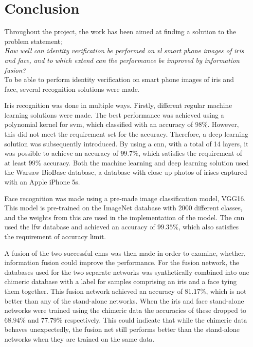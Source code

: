 \chapter{Conclusion}\label{ch:conclusion}\glsresetall
Throughout the project, the work has been aimed at finding a solution to the problem statement; \\

\textit{How well can identity verification be performed on \gls{vl} smart phone images of iris and face, and to which extend can the performance be improved by information fusion?}\\

To be able to perform identity verification on smart phone images of iris and face, several recognition solutions were made.

Iris recognition was done in multiple ways. Firstly, different regular machine learning solutions were made. The best performance was achieved using a polynomial kernel for \gls{svm}, which classified with an accuracy of $98\%$. However, this did not meet the requirement set for the accuracy. Therefore, a deep learning solution was subsequently introduced. By using a \gls{cnn}, with a total of 14 layers, it was possible to achieve an accuracy of $99.7\%$, which satisfies the requirement of at least $99\%$ accuracy. 
Both the machine learning and deep learning solution used the Warsaw-BioBase database, a database with close-up photos of irises captured with an Apple iPhone 5s.

Face recognition was made using a pre-made image classification model, VGG16. This model is pre-trained on the ImageNet database with 2000 different classes, and the weights from this are used in the implementation of the model. The \gls{cnn} used the \gls{lfw} database and achieved an accuracy of $99.35\%$, which also satisfies the requirement of accuracy limit.

A fusion of the two successful \gls{cnn}s was then made in order to examine, whether, information fusion could improve the performance. For the fusion network, the databases used for the two separate networks was synthetically combined into one chimeric database with a label for samples comprising an iris and a face tying them together. This fusion network achieved an accuracy of $81.17\%$, which is not better than any of the stand-alone networks. When the iris and face stand-alone networks were trained using the chimeric data the accuracies of these dropped to $68.94\%$ and $77.79\%$ respectively. This could indicate that while the chimeric data behaves unexpectedly, the fusion net still performs better than the stand-alone networks when they are trained on the same data.